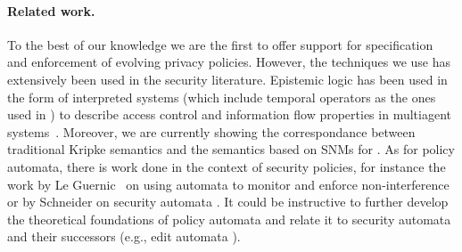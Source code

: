 \paragraph{Related work.} To the best of our knowledge we are the first to offer support for specification and enforcement of evolving privacy policies. However, the techniques we use has extensively been used in the security literature. Epistemic logic has been used in the form of interpreted systems (which include temporal operators as the ones used in \tfppf) to describe access control and information flow properties in multiagent systems~\cite{FHM+95rk,HK08sms,B13lifadp,RT11lkfsn}. Moreover, we are currently showing the correspondance between traditional Kripke semantics and the semantics based on SNMs for \fppf. As for policy automata, there is work done in the context of security policies, for instance the work by Le Guernic \etal~on using automata to monitor and enforce non-interference~\cite{LeGuernic2007,LeGuernic07acmcp} or by Schneider on security automata \cite{Schneider00esp}. It could be instructive to further develop the theoretical foundations of policy automata and relate it to security automata and their successors (e.g., edit automata \cite{LBW05ea}).
